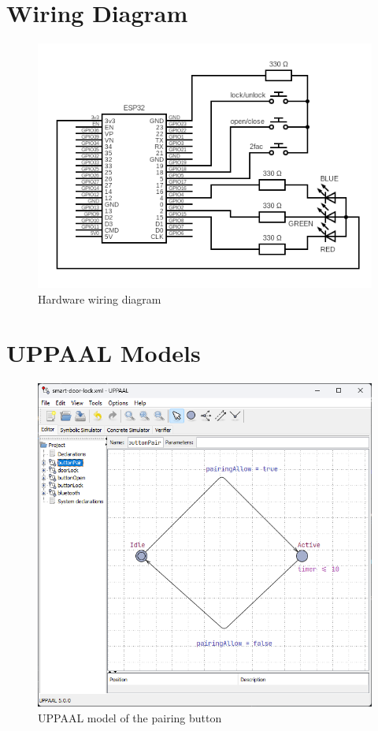 \section{Wiring Diagram}
\label{app:WiringDiagram}

\begin{figure}[tbh]
\includegraphics[width=.95\textwidth]{./../circuit/circuit.png}
\caption{Hardware wiring diagram}
\label{app:fig:WiringDiagram}
\end{figure}

\section{UPPAAL Models}
\label{app:UPPAALModels}

\begin{figure}[tbh]
\includegraphics[width=.45\textwidth]{./../uppaal/buttonPair.png}
\caption{UPPAAL model of the pairing button}
\label{app:fig:UPPAALModelButtonPair}
\end{figure}

